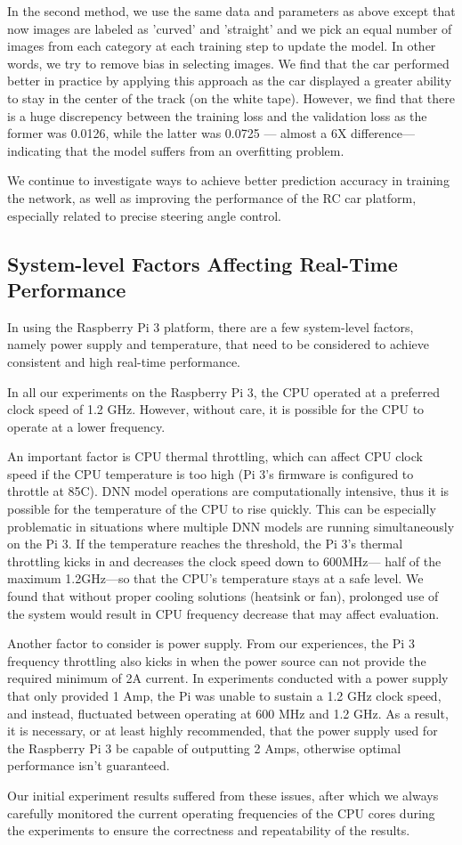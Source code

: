 In the second method, we use the same data and parameters as  above 
except that now images are labeled as 'curved' and 'straight' and we pick an
equal number of images from each category at each training step to
update the model. In other words, we try to remove bias in selecting
images. We find that the car performed better in practice by applying
this approach as the car displayed a greater ability to stay in the
center of the track (on the white tape).
However, we find that there is a huge discrepency between the training
loss and the validation loss as the former was 0.0126, while the latter
was 0.0725 --- almost a 6X difference---indicating that the model 
suffers from an overfitting problem.

We continue to investigate ways to achieve better prediction accuracy
in training the network, as well as improving the performance of the RC
car platform, especially related to precise steering angle control.

\subsection{System-level Factors Affecting Real-Time Performance}
In using the Raspberry Pi 3 platform, there are a
few system-level factors, namely power supply and temperature, that
need to be considered to achieve consistent and high real-time
performance. 

In all our experiments on the Raspberry Pi 3, the CPU  operated at a
preferred clock speed of 1.2 GHz. However, without care, it is
possible for the CPU to operate at a lower frequency. 

An important factor is CPU thermal throttling, which can affect CPU
clock speed if the CPU temperature is too high (Pi 3's firmware is
configured to throttle at 85C).
DNN model operations are computationally intensive, thus it is
possible for the temperature of the CPU to rise quickly. This can be
especially problematic in situations where multiple DNN models are
running simultaneously on the Pi 3.
If the temperature reaches the threshold, the Pi 3's thermal
throttling kicks in and decreases the clock speed down to 600MHz---
half of the maximum 1.2GHz---so that the CPU's temperature stays at a
safe level.
We found that without proper cooling solutions (heatsink or fan), 
prolonged use of the system would result in CPU frequency decrease
that may affect evaluation.

Another factor to consider is power supply. From our experiences, the
Pi 3 frequency throttling also kicks in when the power source can not
provide the required minimum of 2A current.
In experiments conducted with a power supply that only provided 1 Amp,
the Pi was unable to sustain a 1.2 GHz clock speed, and instead,
fluctuated between operating at 600 MHz and 1.2 GHz. As a result, it
is necessary, or at least highly recommended, that the power supply
used for the Raspberry Pi 3 be capable of outputting 2 Amps, otherwise
optimal performance isn't guaranteed.

Our initial experiment results suffered from these issues, after which
we always carefully monitored the current operating frequencies of the
CPU cores during the experiments to ensure the correctness and
repeatability of the results.
